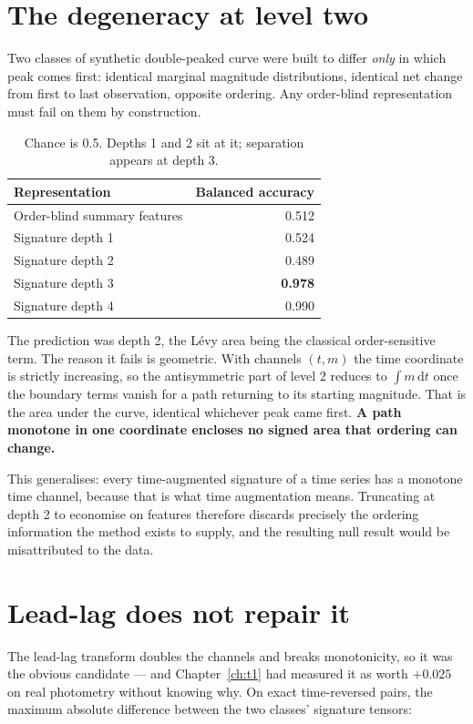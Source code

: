 \documentclass[11pt,a4paper]{report}
\begin{document}
\section{The degeneracy at level two}

Two classes of synthetic double-peaked curve were built to differ \emph{only} in which peak
comes first: identical marginal magnitude distributions, identical net change from first to
last observation, opposite ordering. Any order-blind representation must fail on them by
construction.

\begin{table}[h]
\centering
\small
\begin{tabular}{lr}
\toprule
Representation & Balanced accuracy \\
\midrule
Order-blind summary features & 0.512 \\
Signature depth 1 & 0.524 \\
Signature depth 2 & 0.489 \\
Signature depth 3 & \textbf{0.978} \\
Signature depth 4 & 0.990 \\
\bottomrule
\end{tabular}
\caption{Chance is 0.5. Depths 1 and 2 sit at it; separation appears at depth 3.}
\end{table}

The prediction was depth 2, the L\'evy area being the classical order-sensitive term. The
reason it fails is geometric. With channels $(t, m)$ the time coordinate is strictly
increasing, so the antisymmetric part of level 2 reduces to $\int m\,\mathrm{d}t$ once the
boundary terms vanish for a path returning to its starting magnitude. That is the area under
the curve, identical whichever peak came first. \textbf{A path monotone in one coordinate
encloses no signed area that ordering can change.}

This generalises: every time-augmented signature of a time series has a monotone time
channel, because that is what time augmentation means. Truncating at depth 2 to economise on
features therefore discards precisely the ordering information the method exists to supply,
and the resulting null result would be misattributed to the data.

\section{Lead-lag does not repair it}

The lead-lag transform doubles the channels and breaks monotonicity, so it was the obvious
candidate --- and Chapter~\ref{ch:t1} had measured it as worth $+0.025$ on real photometry
without knowing why. On exact time-reversed pairs, the maximum absolute difference between
the two classes' signature tensors:
\end{document}
